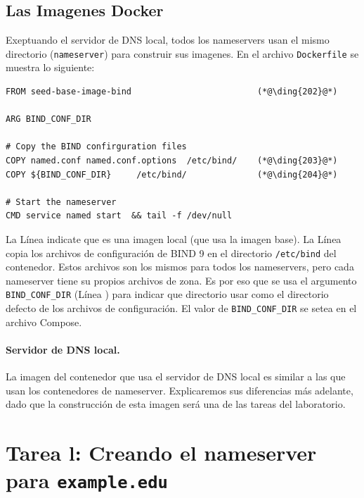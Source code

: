 \subsection{Las Imagenes Docker} 

Exeptuando el servidor de DNS local, todos los nameservers usan el mismo directorio (\texttt{nameserver}) para construir sus imagenes. En el archivo \texttt{Dockerfile} se muestra lo siguiente:


\begin{lstlisting}
FROM seed-base-image-bind                         (*@\ding{202}@*)

ARG BIND_CONF_DIR

# Copy the BIND confirguration files
COPY named.conf named.conf.options  /etc/bind/    (*@\ding{203}@*)
COPY ${BIND_CONF_DIR}     /etc/bind/              (*@\ding{204}@*)

# Start the nameserver
CMD service named start  && tail -f /dev/null
\end{lstlisting}

La Línea  indicate que es una imagen local (que usa la imagen base).
La Línea  copia los archivos de configuración de BIND 9 en el directorio  \texttt{/etc/bind} del contenedor. Estos archivos son los mismos para todos los nameservers, pero cada nameserver tiene su propios archivos de zona. Es por eso que se usa el argumento \texttt{BIND\_CONF\_DIR} (Línea ) para indicar que directorio usar como el directorio defecto de los archivos de configuración. El valor de \texttt{BIND\_CONF\_DIR}  se setea en el archivo Compose.


\paragraph{Servidor de DNS local.}
La imagen del contenedor que usa el servidor de DNS local es similar a las que usan los contenedores de nameserver. Explicaremos sus diferencias más adelante, dado que la construcción de esta imagen será una de las tareas del laboratorio.


\section{Tarea l: Creando el nameserver para \texttt{example.edu}}

